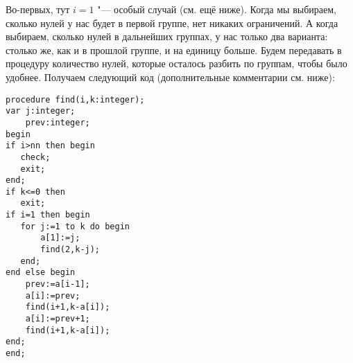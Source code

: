 Во-первых, тут $i=1$ "--- особый случай (см. ещё ниже). Когда мы выбираем, сколько нулей у нас 
будет в первой группе, нет никаких ограничений. А когда выбираем, сколько нулей 
в дальнейших группах, у нас только два варианта: столько же, как и в прошлой 
группе, и на единицу больше. Будем передавать в процедуру количество нулей, 
которые осталось разбить по группам, чтобы было удобнее.
Получаем следующий код (дополнительные комментарии см. ниже):

\begin{codesample}\begin{verbatim}
procedure find(i,k:integer); 
var j:integer;
    prev:integer;
begin
if i>nn then begin
   check;
   exit;
end;
if k<=0 then 
   exit;
if i=1 then begin
   for j:=1 to k do begin
       a[1]:=j;
       find(2,k-j);
   end;
end else begin
    prev:=a[i-1]; 
    a[i]:=prev;
    find(i+1,k-a[i]);
    a[i]:=prev+1;
    find(i+1,k-a[i]);
end;
end;
\end{verbatim}
\end{codesample}


